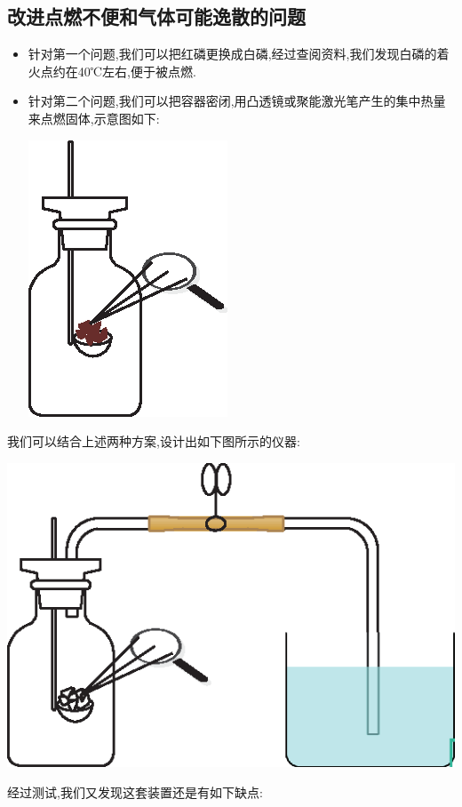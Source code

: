 \documentclass[11pt,a4paper,titlepage,twocolumn]{ctexart}
\begin{document}
	\subsection{改进点燃不便和气体可能逸散的问题}
	\begin{itemize}
		\item 针对第一个问题,我们可以把红磷更换成白磷,经过查阅资料,我们发现白磷的着火点约在40℃左右,便于被点燃.
		\item 针对第二个问题,我们可以把容器密闭,用凸透镜或聚能激光笔产生的集中热量来点燃固体,示意图如下:\\
		\begin{center}
			\includegraphics[width=0.4\linewidth]{fig/2}
		\end{center}
		
	\end{itemize}
	
	我们可以结合上述两种方案,设计出如下图所示的仪器:
	
	\begin{center}
		\includegraphics[width=0.8\linewidth]{fig/3}
	\end{center}
	

	经过测试,我们又发现这套装置还是有如下缺点:
	
\end{document}
